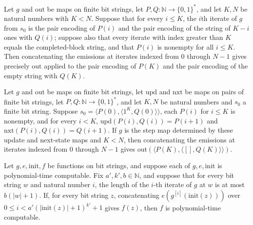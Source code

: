 \begin{theorem}
\label{Complexity.BlockLoop.flatMap_emit_orbit}
\leanok
{}
Let $g$ and $\mathrm{out}$ be maps on finite bit strings, let
$P,Q:\mathbb{N}\to\{0,1\}^*$, and let $K,N$ be natural numbers with $K<N$. Suppose that
for every $i\le K$, the $i$th iterate of $g$ from $s_0$ is the pair encoding of $P(i)$
and the pair encoding of the string of $K-i$ ones with $Q(i)$; suppose also that every
iterate with index greater than $K$ equals the completed-block string, and that $P(i)$
is nonempty for all $i\le K$. Then concatenating the emissions at iterates indexed from
$0$ through $N-1$ gives precisely $\mathrm{out}$ applied to the pair encoding of $P(K)$
and the pair encoding of the empty string with $Q(K)$.
\end{theorem}

\begin{theorem}
\label{Complexity.BlockLoop.loop_output}
\leanok
{}
Let $g$ and $\mathrm{out}$ be maps on finite bit strings, let $\mathrm{upd}$ and
$\mathrm{nxt}$ be maps on pairs of finite bit strings, let $P,Q:\mathbb{N}\to\{0,1\}^*$,
and let $K,N$ be natural numbers and $s_0$ a finite bit string. Suppose $s_0=\langle
P(0),\langle 1^K,Q(0)\rangle\rangle$, each $P(i)$ for $i\le K$ is nonempty, and for
every $i<K$, $\mathrm{upd}(P(i),Q(i))=P(i+1)$ and $\mathrm{nxt}(P(i),Q(i))=Q(i+1)$. If
$g$ is the step map determined by these update and next-state maps and $K<N$, then
concatenating the emissions at iterates indexed from $0$ through $N-1$ gives
$\mathrm{out}(\langle P(K),\langle [],Q(K)\rangle\rangle)$.
\end{theorem}

\begin{theorem}
\label{Complexity.BlockLoop.polyTimeComputable_of_loop}
\leanok
{}
Let $g,e,\mathrm{init},f$ be functions on bit strings, and suppose each of
$g,e,\mathrm{init}$ is polynomial-time computable. Fix $a',k',b\in\mathbb{N}$, and
suppose that for every bit string $w$ and natural number $i$, the length of the $i$-th
iterate of $g$ at $w$ is at most $b(|w|+1)$. If, for every bit string $z$, concatenating
$e(g^{[i]}(\mathrm{init}(z)))$ over $0\le i<a'(|\mathrm{init}(z)|+1)^{k'}+1$ gives
$f(z)$, then $f$ is polynomial-time computable.
\end{theorem}

